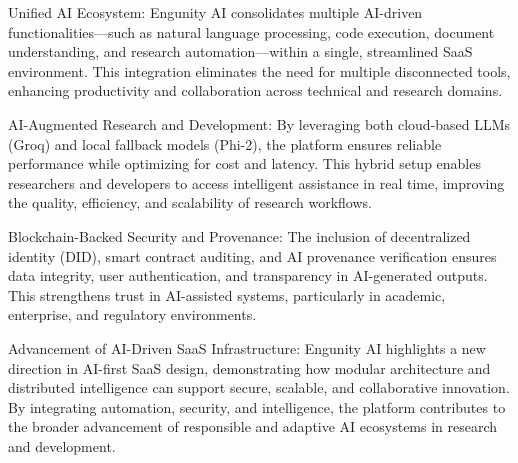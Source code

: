 Unified AI Ecosystem: Engunity AI consolidates multiple AI-driven functionalities—such as natural language processing, code execution, document understanding, and research automation—within a single, streamlined SaaS environment. This integration eliminates the need for multiple disconnected tools, enhancing productivity and collaboration across technical and research domains.

AI-Augmented Research and Development: By leveraging both cloud-based LLMs (Groq) and local fallback models (Phi-2), the platform ensures reliable performance while optimizing for cost and latency. This hybrid setup enables researchers and developers to access intelligent assistance in real time, improving the quality, efficiency, and scalability of research workflows.

Blockchain-Backed Security and Provenance: The inclusion of decentralized identity (DID), smart contract auditing, and AI provenance verification ensures data integrity, user authentication, and transparency in AI-generated outputs. This strengthens trust in AI-assisted systems, particularly in academic, enterprise, and regulatory environments.

Advancement of AI-Driven SaaS Infrastructure: Engunity AI highlights a new direction in AI-first SaaS design, demonstrating how modular architecture and distributed intelligence can support secure, scalable, and collaborative innovation. By integrating automation, security, and intelligence, the platform contributes to the broader advancement of responsible and adaptive AI ecosystems in research and development.



\cite{goodfellow2016deep}
\pagebreak


